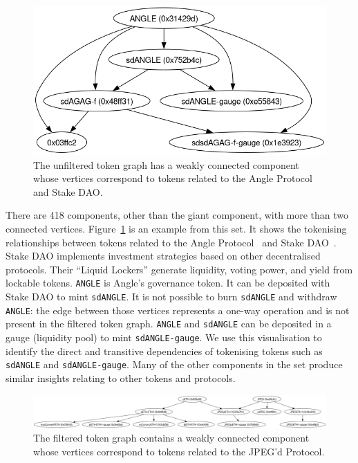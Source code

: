 \begin{figure}
  \centerline{\includegraphics[width=\columnwidth]{img/medium-components/angle-protocol.png}}
  \caption{The unfiltered token graph has a weakly connected component
    whose vertices correspond to tokens related to the Angle Protocol
    and Stake DAO.}\label{fig:angle-protocol}
\end{figure}

There are \num{418} components, other than the giant component, with
more than two connected vertices.  Figure~\ref{fig:angle-protocol} is
an example from this set.  It shows the tokenising relationships
between tokens related to the Angle Protocol~\cite{angle-xx} and Stake
DAO~\cite{stake-dao-xx}.  Stake DAO implements investment strategies
based on other decentralised protocols.  Their ``Liquid Lockers''
generate liquidity, voting power, and yield from lockable tokens.
\texttt{ANGLE} is Angle's governance token.  It can be deposited with
Stake DAO to mint \texttt{sdANGLE}.  It is not possible to burn
\texttt{sdANGLE} and withdraw \texttt{ANGLE}: the edge between those
vertices represents a one-way operation and is not present in the
filtered token graph. \texttt{ANGLE} and \texttt{sdANGLE} can be
deposited in a gauge (liquidity pool) to mint \texttt{sdANGLE-gauge}.
We use this visualisation to identify the direct and transitive
dependencies of tokenising tokens such as \texttt{sdANGLE} and
\texttt{sdANGLE-gauge}.  Many of the other components in the set
produce similar insights relating to other tokens and protocols.

\begin{figure}
  \centerline{\includegraphics[width=\textwidth]{img/medium-components/jpegd-protocol.png}}
  \caption{The filtered token graph contains a weakly connected
    component whose vertices correspond to tokens related to the
    JPEG'd Protocol.}\label{fig:jpegd-protocol}
\end{figure}

